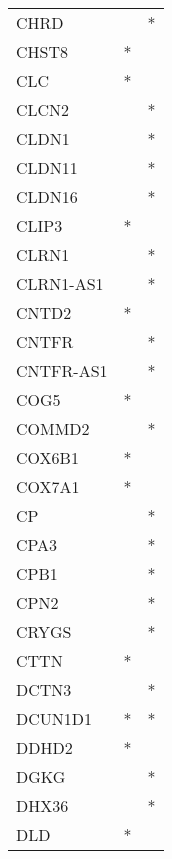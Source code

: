\begin{longtable}{lcc}
CHRD             &                &          * \\
CHST8            &              * &            \\
CLC              &              * &            \\
CLCN2            &                &          * \\
CLDN1            &                &          * \\
CLDN11           &                &          * \\
CLDN16           &                &          * \\
CLIP3            &              * &            \\
CLRN1            &                &          * \\
CLRN1-AS1        &                &          * \\
CNTD2            &              * &            \\
CNTFR            &                &          * \\
CNTFR-AS1        &                &          * \\
COG5             &              * &            \\
COMMD2           &                &          * \\
COX6B1           &              * &            \\
COX7A1           &              * &            \\
CP               &                &          * \\
CPA3             &                &          * \\
CPB1             &                &          * \\
CPN2             &                &          * \\
CRYGS            &                &          * \\
CTTN             &              * &            \\
DCTN3            &                &          * \\
DCUN1D1          &              * &          * \\
DDHD2            &              * &            \\
DGKG             &                &          * \\
DHX36            &                &          * \\
DLD              &              * &            \\

\end{longtable}

